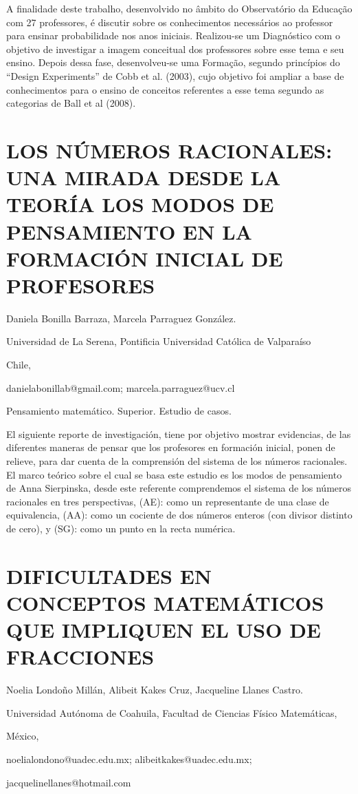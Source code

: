 A finalidade deste trabalho, desenvolvido no âmbito do Observatório
da Educação com 27 professores, é discutir sobre os conhecimentos
necessários ao professor para ensinar probabilidade nos anos iniciais.
Realizou-se um Diagnóstico com o objetivo de investigar a imagem conceitual
dos professores sobre esse tema e seu ensino. Depois dessa fase, desenvolveu-se
uma Formação, segundo princípios do “Design Experiments” de Cobb et
al. (2003), cujo objetivo foi ampliar a base de conhecimentos para
o ensino de conceitos referentes a esse tema segundo as categorias
de Ball et al (2008). 


\section{LOS NÚMEROS RACIONALES: UNA MIRADA DESDE LA TEORÍA LOS MODOS DE PENSAMIENTO
EN LA FORMACIÓN INICIAL DE PROFESORES}

\begin{datos}

Daniela Bonilla Barraza, Marcela Parraguez González.

Universidad de La Serena, Pontificia Universidad Católica de Valparaíso

Chile, 

danielabonillab@gmail.com; marcela.parraguez@ucv.cl

\end{datos}

Pensamiento matemático. Superior. Estudio de casos. 

El siguiente reporte de investigación, tiene por objetivo mostrar
evidencias, de las diferentes maneras de pensar que los profesores
en formación inicial, ponen de relieve, para dar cuenta de la comprensión
del sistema de los números racionales. El marco teórico sobre el cual
se basa este estudio es los modos de pensamiento de Anna Sierpinska,
desde este referente comprendemos el sistema de los números racionales
en tres perspectivas, (AE): como un representante de una clase de
equivalencia, (AA): como un cociente de dos números enteros (con divisor
distinto de cero), y (SG): como un punto en la recta numérica.


\section{DIFICULTADES EN CONCEPTOS MATEMÁTICOS QUE IMPLIQUEN EL USO DE FRACCIONES}

\begin{datos}

Noelia Londoño Millán, Alibeit Kakes Cruz, Jacqueline Llanes Castro.

Universidad Autónoma de Coahuila, Facultad de Ciencias Físico Matemáticas,

México,

noelialondono@uadec.edu.mx; alibeitkakes@uadec.edu.mx;

jacquelinellanes@hotmail.com

\end{datos}

